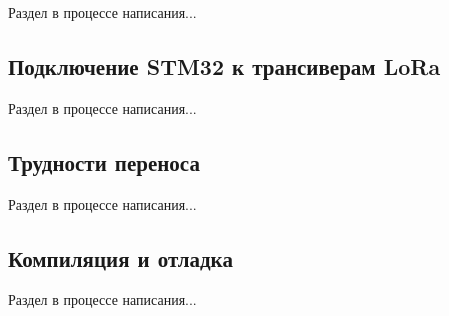 Раздел в процессе написания...

\subsection{Подключение STM32 к трансиверам LoRa}
Раздел в процессе написания...


\subsection{Трудности переноса}
Раздел в процессе написания...


\subsection{Компиляция и отладка}
Раздел в процессе написания...





